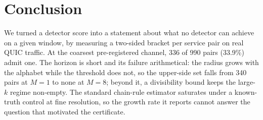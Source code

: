 \section{Conclusion}
\label{sec:conclusion}

We turned a detector score into a statement about what no detector can achieve on
a given window, by measuring a two-sided bracket per service pair on real QUIC
traffic. At the coarsest pre-registered channel, 336 of 990 pairs (33.9\%) admit
one. The horizon is short and its failure arithmetical: the radius grows with the
alphabet while the threshold does not, so the upper-side set falls from 340 pairs
at $M{=}1$ to none at $M{=}8$; beyond it, a divisibility bound keeps the large-$k$
regime non-empty. The standard chain-rule estimator saturates under a
known-truth control at fine resolution, so the growth rate it reports cannot
answer the question that motivated the certificate.
